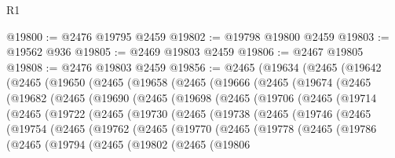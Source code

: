 \begin{lexlean}{R1}
\begin{coremodule}
@19800 := @2476 @19795 @2459
@19802 := @19798 @19800 @2459
@19803 := @19562 @936
@19805 := @2469 @19803 @2459
@19806 := @2467 @19805
@19808 := @2476 @19803 @2459
@19856 := @2465
    (@19634
      (@2465
        (@19642
          (@2465
            (@19650
              (@2465
                (@19658
                  (@2465
                    (@19666
                      (@2465
                        (@19674
                          (@2465
                            (@19682
                              (@2465
                                (@19690
                                  (@2465
                                    (@19698
                                      (@2465
                                        (@19706
                                          (@2465
                                            (@19714
                                              (@2465
                                                (@19722
                                                  (@2465
                                                    (@19730
                                                      (@2465
                                                        (@19738
                                                          (@2465
                                                            (@19746
                                                              (@2465
                                                                (@19754
                                                                  (@2465
                                                                    (@19762
                                                                      (@2465
                                                                        (@19770
                                                                          (@2465
                                                                            (@19778
                                                                              (@2465
                                                                                (@19786
                                                                                  (@2465
                                                                                    (@19794
                                                                                      (@2465
                                                                                        (@19802
                                                                                          (@2465
                                                                                            (@19806

\end{coremodule}
\end{lexlean}
